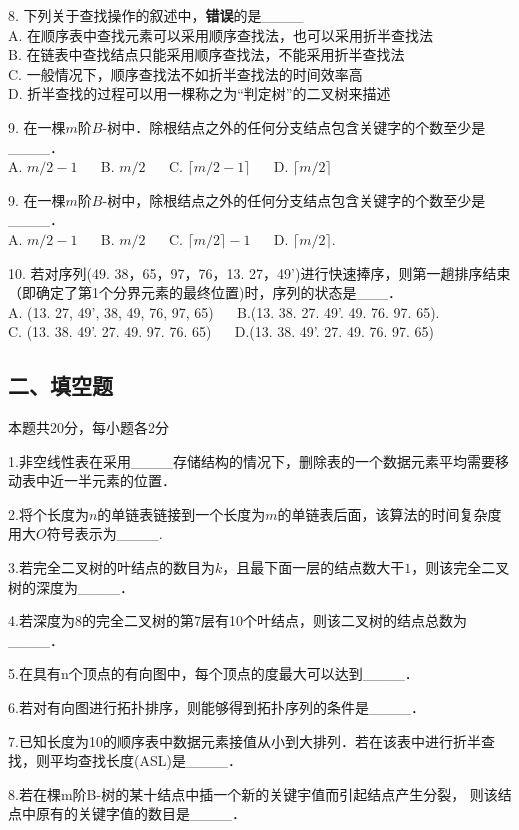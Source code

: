 8. 下列关于查找操作的叙述中，\textbf{错误}的是____ \\
A. 在顺序表中查找元素可以采用顺序查找法，也可以采用折半查找法 \\
B. 在链表中查找结点只能采用顺序查找法，不能采用折半查找法 \\
C. 一般情况下，顺序查找法不如折半查找法的时间效率高 \\
D. 折半查找的过程可以用一棵称之为“判定树”的二叉树来描述

9. 在一棵$m$阶$B$-树中．除根结点之外的任何分支结点包含关键字的个数至少是____． \\
A. $m/2-1$ $\quad$ B. $m/2$ $\quad$ C. $\lceil m/2-1 \rceil $ $\quad$ D. $\lceil m/2 \rceil $

9. 在一棵$m$阶$B$-树中，除根结点之外的任何分支结点包含关键字的个数至少是____． \\
A. $m/2-1$ $\quad$ B. $m/2$ $\quad$ C. $\lceil m/2 \rceil-1$ $\quad$ D. $\lceil m/2 \rceil$.

10. 若对序列(49. 38，65，97，76，13. 27，49')进行快速捧序，则第一趟排序结束（即确定了第1个分界元素的最终位置)时，序列的状态是___． \\
A. (13. 27, 49', 38, 49, 76, 97, 65) $\quad$ B.(13. 38. 27. 49'. 49. 76. 97. 65). \\
C. (13. 38. 49'. 27. 49. 97. 76. 65) $\quad$ D.(13. 38. 49'. 27. 49. 76. 97. 65)

\subsection{二、填空题}
本题共20分，每小题各2分

1.非空线性表在采用____存储结构的情况下，删除表的一个数据元素平均需要移动表中近一半元素的位置．

2.将个长度为$n$的单链表链接到一个长度为$m$的单链表后面，该算法的时间复杂度用大$O$符号表示为____.

3.若完全二叉树的叶结点的数目为$k$，且最下面一层的结点数大干$1$，则该完全二叉树的深度为____．

4.若深度为8的完全二叉树的第7层有10个叶结点，则该二叉树的结点总数为____．

5.在具有n个顶点的有向图中，每个顶点的度最大可以达到____．

6.若对有向图进行拓扑排序，则能够得到拓扑序列的条件是____．

7.已知长度为10的顺序表中数据元素接值从小到大排列．若在该表中进行折半查找，则平均查找长度(ASL)是____．

8.若在棵m阶B-树的某十结点中插一个新的关键宇值而引起结点产生分裂，
则该结点中原有的关键字值的数目是____．

